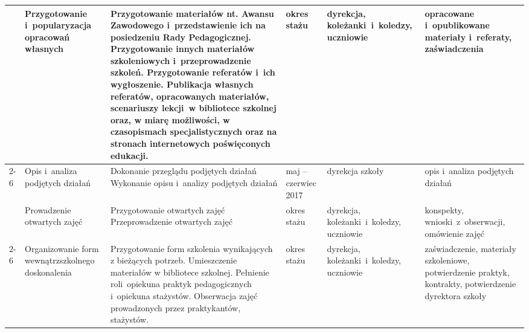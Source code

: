 \documentclass[a4paper,titlepage,13pt,draft]{mwart}
\begin{document}
\begin{tabular}{ | p{2.4cm} | p{2.5cm} | p{5cm} | p{1.4cm} | p{2cm} | p{2.1cm} |}
\multiline{Opracowanie co najmniej dwóch publikacji, referatów lub innych materiałów związanych z~wykonywaną pracą i~opublikowanie ich, wygłoszenie lub popularyzację w~innej formie
(§ 5 ust. 2 pkt. 3b,\newline
§ 7 ust. 4 pkt. 2 i~4)}
&Przygotowanie i~popularyzacja opracowań własnych&Przygotowanie materiałów nt. Awansu Zawodowego i~przedstawienie ich na posiedzeniu Rady Pedagogicznej.\newline
Przygotowanie innych materiałów szkoleniowych i~przeprowadzenie szkoleń.\newline
Przygotowanie referatów i~ich wygłoszenie.\newline
Publikacja własnych referatów, opracowanych materiałów, scenariuszy lekcji~w bibliotece szkolnej oraz, w miarę możliwości, w czasopismach specjalistycznych oraz na stronach internetowych poświęconych edukacji.&okres stażu&dyrekcja, koleżanki~i~koledzy, uczniowie&
opracowane i~opublikowane materiały i~referaty, zaświadczenia\\ \cline{2-6}
&Opis i~analiza podjętych działań&Dokonanie przeglądu podjętych działań\newline
Wykonanie opisu i~analizy podjętych działań&maj -- czerwiec 2017&dyrekcja szkoły&opis i~analiza podjętych działań\\ \hline
\multiline{
Prowadzenie otwartych zajęć, w szczególności~dla nauczycieli~stażystów i~nauczycieli~kontraktowych lub podejmowanie działań związanych z~wewnątrzszkolnym doskonaleniem zawodowym
(§ 5 ust. 2 pkt. 3c,\newline
§ 7 ust. 4 pkt. 2 i~4)}
&Prowadzenie otwartych zajęć&Przygotowanie otwartych zajęć\newline
Przeprowadzenie otwartych zajęć&okres stażu&dyrekcja, koleżanki~i~koledzy, uczniowie&
konspekty, wnioski~z~obserwacji, omówienie zajęć\\ \cline{2-6}
&Organizowanie form wewnątrzszkolnego doskonalenia&Przygotowanie form szkolenia wynikających z bieżących potrzeb.\newline
Umieszczenie materiałów w bibliotece szkolnej.\newline
Pełnienie roli~opiekuna praktyk pedagogicznych i~opiekuna stażystów.\newline
Obserwacja zajęć prowadzonych przez praktykantów, stażystów.&okres stażu&dyrekcja, koleżanki~i~koledzy, uczniowie&
zaświadczenie, materiały szkoleniowe, potwierdzenie praktyk,
kontrakty, potwierdzenie dyrektora szkoły\\ \hline









\end{tabular}
\end{document}
